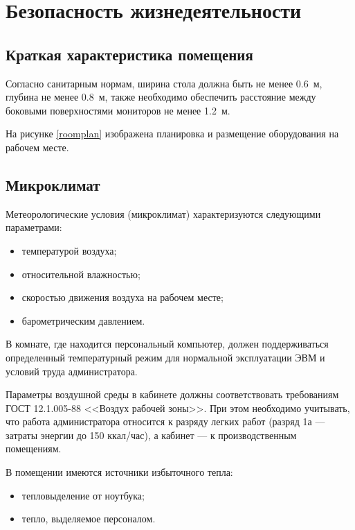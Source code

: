\section{Безопасность жизнедеятельности}

\subsection{Краткая характеристика помещения}

Согласно санитарным нормам, ширина стола должна быть не менее 0.6~м, глубина не менее 0.8~м, также необходимо обеспечить расстояние между боковыми поверхностями мониторов не менее 1.2~м.

На рисунке \ref{roomplan} изображена планировка и размещение оборудования на рабочем месте.

\subsection{Микроклимат}

Метеорологические условия (микроклимат) характеризуются следующими параметрами:
\begin{itemize}
  \item температурой воздуха;
  \item относительной влажностью;
  \item скоростью движения воздуха на рабочем месте;
  \item барометрическим давлением.
\end{itemize}

В комнате, где находится персональный компьютер, должен поддерживаться определенный температурный режим для нормальной эксплуатации ЭВМ и условий труда администратора.

Параметры воздушной среды в кабинете должны соответствовать требованиям ГОСТ 12.1.005-88 <<Воздух рабочей зоны>>.
При этом необходимо учитывать, что работа администратора относится к разряду легких работ (разряд 1а --- затраты энергии до 150 ккал/час), а кабинет --- к производственным помещениям.

В помещении имеются источники избыточного тепла:
\begin{itemize}
  \item тепловыделение от ноутбука;
  \item тепло, выделяемое персоналом.
\end{itemize}

